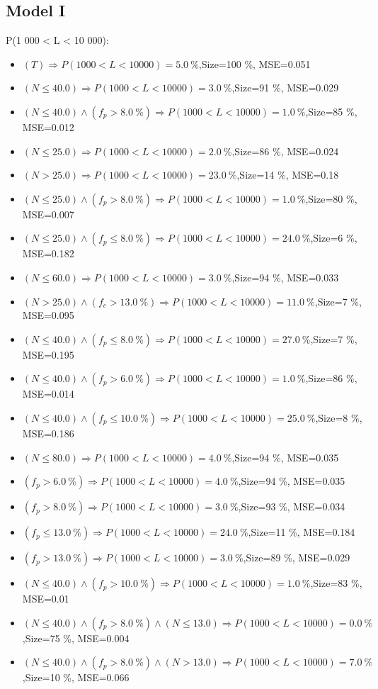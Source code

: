 \documentclass[numbered]{CSL}
\begin{document}
\subsection{Model I}
P(1 000 < L < 10 000):
\begin{itemize}
\item $(T) \Rightarrow P(1 000 < L < 10 000) = 5.0~\%$,\hfill Size=100 \%, MSE=0.051
\item $(N \leq 40.0) \Rightarrow P(1 000 < L < 10 000) = 3.0~\%$,\hfill Size=91 \%, MSE=0.029
\item $(N \leq 40.0) \land (f_p > 8.0~\%) \Rightarrow P(1 000 < L < 10 000) = 1.0~\%$,\hfill Size=85 \%, MSE=0.012
\item $(N \leq 25.0) \Rightarrow P(1 000 < L < 10 000) = 2.0~\%$,\hfill Size=86 \%, MSE=0.024
\item $(N > 25.0) \Rightarrow P(1 000 < L < 10 000) = 23.0~\%$,\hfill Size=14 \%, MSE=0.18
\item $(N \leq 25.0) \land (f_p > 8.0~\%) \Rightarrow P(1 000 < L < 10 000) = 1.0~\%$,\hfill Size=80 \%, MSE=0.007
\item $(N \leq 25.0) \land (f_p \leq 8.0~\%) \Rightarrow P(1 000 < L < 10 000) = 24.0~\%$,\hfill Size=6 \%, MSE=0.182
\item $(N \leq 60.0) \Rightarrow P(1 000 < L < 10 000) = 3.0~\%$,\hfill Size=94 \%, MSE=0.033
\item $(N > 25.0) \land (f_c > 13.0~\%) \Rightarrow P(1 000 < L < 10 000) = 11.0~\%$,\hfill Size=7 \%, MSE=0.095
\item $(N \leq 40.0) \land (f_p \leq 8.0~\%) \Rightarrow P(1 000 < L < 10 000) = 27.0~\%$,\hfill Size=7 \%, MSE=0.195
\item $(N \leq 40.0) \land (f_p > 6.0~\%) \Rightarrow P(1 000 < L < 10 000) = 1.0~\%$,\hfill Size=86 \%, MSE=0.014
\item $(N \leq 40.0) \land (f_p \leq 10.0~\%) \Rightarrow P(1 000 < L < 10 000) = 25.0~\%$,\hfill Size=8 \%, MSE=0.186
\item $(N \leq 80.0) \Rightarrow P(1 000 < L < 10 000) = 4.0~\%$,\hfill Size=94 \%, MSE=0.035
\item $(f_p > 6.0~\%) \Rightarrow P(1 000 < L < 10 000) = 4.0~\%$,\hfill Size=94 \%, MSE=0.035
\item $(f_p > 8.0~\%) \Rightarrow P(1 000 < L < 10 000) = 3.0~\%$,\hfill Size=93 \%, MSE=0.034
\item $(f_p \leq 13.0~\%) \Rightarrow P(1 000 < L < 10 000) = 24.0~\%$,\hfill Size=11 \%, MSE=0.184
\item $(f_p > 13.0~\%) \Rightarrow P(1 000 < L < 10 000) = 3.0~\%$,\hfill Size=89 \%, MSE=0.029
\item $(N \leq 40.0) \land (f_p > 10.0~\%) \Rightarrow P(1 000 < L < 10 000) = 1.0~\%$,\hfill Size=83 \%, MSE=0.01
\item $(N \leq 40.0) \land (f_p > 8.0~\%) \land (N \leq 13.0) \Rightarrow P(1 000 < L < 10 000) = 0.0~\%$,\hfill Size=75 \%, MSE=0.004
\item $(N \leq 40.0) \land (f_p > 8.0~\%) \land (N > 13.0) \Rightarrow P(1 000 < L < 10 000) = 7.0~\%$,\hfill Size=10 \%, MSE=0.066
\end{itemize}
\end{document}
